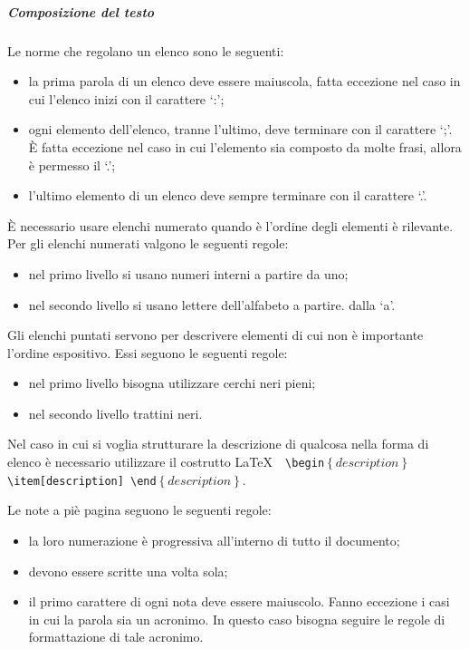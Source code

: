 \documentclass[../NormeProgetto.tex]{subfiles}
\begin{document}
		\subparagraph{Composizione del testo}
			Le norme che regolano un elenco sono le seguenti:
			\begin{itemize}
				\item la prima parola di un elenco deve essere maiuscola, fatta eccezione nel caso in cui l'elenco inizi con il carattere `:';
				\item ogni elemento dell'elenco, tranne l'ultimo, deve terminare con il carattere `;'. È fatta eccezione nel caso in cui l'elemento sia composto da molte frasi, allora è permesso il `.';
				\item l'ultimo elemento di un elenco deve sempre terminare con il carattere `.'.
			\end{itemize}
È necessario usare elenchi numerato quando è l'ordine degli elementi è rilevante. Per gli elenchi numerati valgono le seguenti regole:
			\begin{itemize}
				\item nel primo livello si usano numeri interni a partire da uno;
				\item nel secondo livello si usano lettere dell'alfabeto a partire. dalla `a'.
			\end{itemize}
Gli elenchi puntati servono per descrivere elementi di cui non è importante l'ordine espositivo. Essi seguono le seguenti regole:
			\begin{itemize}
				\item nel primo livello bisogna utilizzare cerchi neri pieni;
				\item nel secondo livello trattini neri.
			\end{itemize}
			
			
			Nel caso in cui si voglia strutturare la descrizione di qualcosa nella forma di elenco è necessario utilizzare il costrutto \LaTeX\ \texttt{ \textbackslash begin$\left\{description\right\}$ \textbackslash item[description] \textbackslash end$\left\{description\right\}$}.			
			
			Le note a piè pagina seguono le seguenti regole:
			\begin{itemize}
				\item la loro numerazione è progressiva all'interno di tutto il documento;
				\item devono essere scritte una volta sola;
				\item il primo carattere di ogni nota deve essere maiuscolo. Fanno eccezione i casi in cui la parola sia un acronimo. In questo caso bisogna seguire le regole di formattazione di tale acronimo.
			\end{itemize}
			
\end{document}
